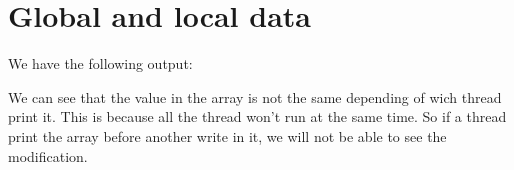 \chapter{Global and local data}

We have the following output:



We can see that the value in the array is not the same depending of wich thread print it. This is because all the thread won't run at the same time. So if a thread print the array before another write in it, we will not be able to see the modification.
